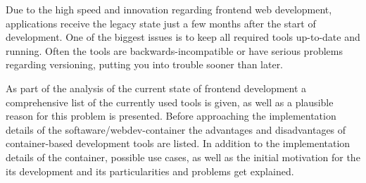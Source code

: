 Due to the high speed and innovation regarding frontend web development, applications receive the legacy state just a few months after the start of development.
One of the biggest issues is to keep all required tools up-to-date and running.
Often the tools are backwards-incompatible or have serious problems regarding versioning, putting you into trouble sooner than later.

As part of the analysis of the current state of frontend development a comprehensive list of the currently used tools is given, as well as a plausible reason for this problem is presented.
Before approaching the implementation details of the softaware/webdev-container the advantages and disadvantages of container-based development tools are listed.
In addition to the implementation details of the container, possible use cases, as well as the initial motivation for the its development and its particularities and problems get explained.
